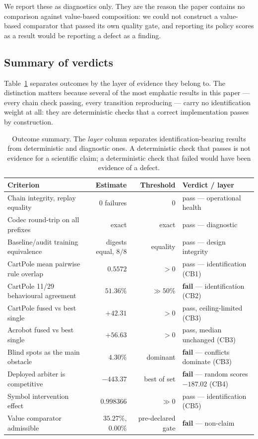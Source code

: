 \documentclass[11pt,a4paper]{article}
\begin{document}
We report these as diagnostics only. They are the reason the paper contains no comparison against value-based composition: we could not construct a value-based comparator that passed its own quality gate, and reporting its policy scores as a result would be reporting a defect as a finding.

\subsection{Summary of verdicts}

Table~\ref{tab:verdicts} separates outcomes by the layer of evidence they belong to. The distinction matters because several of the most emphatic results in this paper --- every chain check passing, every transition reproducing --- carry no identification weight at all: they are deterministic checks that a correct implementation passes by construction.

\begin{table}[H]
\centering
\caption{Outcome summary. The \emph{layer} column separates identification-bearing results from deterministic and diagnostic ones. A deterministic check that passes is not evidence for a scientific claim; a deterministic check that failed would have been evidence of a defect.}
\label{tab:verdicts}
\small
\begin{tabular}{@{}p{52mm} r r >{\raggedright\arraybackslash}p{36mm}@{}}
\toprule
\textbf{Criterion} & \textbf{Estimate} & \textbf{Threshold} & \textbf{Verdict / layer} \\
\midrule
Chain integrity, replay equality & $0$ failures & $0$ & pass --- operational health \\
Codec round-trip on all prefixes & exact & exact & pass --- diagnostic \\
Baseline/audit training equivalence & digests equal, $8/8$ & equality & pass --- design integrity \\
CartPole mean pairwise rule overlap & $0.5572$ & $>0$ & pass --- identification (CB1) \\
CartPole 11/29 behavioural agreement & $51.36\%$ & $\gg 50\%$ & \textbf{fail} --- identification (CB2) \\
CartPole fused vs best single & $+42.31$ & $>0$ & pass, ceiling-limited (CB3) \\
Acrobot fused vs best single & $+56.63$ & $>0$ & pass, median unchanged (CB3) \\
Blind spots as the main obstacle & $4.30\%$ & dominant & \textbf{fail} --- conflicts dominate (CB3) \\
Deployed arbiter is competitive & $-443.37$ & best of set & \textbf{fail} --- random scores $-187.02$ (CB4) \\
Symbol intervention effect & $0.998366$ & $\gg 0$ & pass --- identification (CB5) \\
Value comparator admissible & $35.27\%$, $0.00\%$ & pre-declared gate & \textbf{fail} --- non-claim \\
\bottomrule
\end{tabular}
\end{table}
\end{document}

